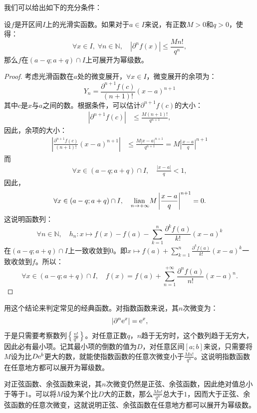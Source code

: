 \documentclass[12pt,UTF8,fontset=none]{ctexbook}
\begin{document}
\begin{appendix}
我们可以给出如下的充分条件：
\begin{tm}\label{tm:c-5-10}
    设$f$是开区间$I$上的光滑实函数。如果对于$a\in I$来说，有正数$M>0$和$q>0$，使得：
    $$ \forall x \in I, \; \forall n \in \mathbb{N},\quad |\partial^n f (x)| \leqslant \frac{M n!}{q^n}, $$
    那么$f$在$(a-q;a+q)\cap I$上可展开为幂级数。
\end{tm}

\begin{proof}
    考虑光滑函数在$a$处的微变展开，$\forall x \in I$，微变展开的余项为：
    $$ Y_n = \frac{\partial^{n+1} f (c)}{(n+1)!}(x - a)^{n+1} $$
    其中$c$是$x$与$a$之间的数。根据条件，可以估计$\partial^{n+1} f (c)$的大小：
    \begin{align*}
        |\partial^{n+1} f (c)| &\leqslant \frac{M (n+1)!}{q^{n+1}},
    \end{align*}
    因此，余项的大小：
    \begin{align*}
        \left|\frac{\partial^{n+1} f (c)}{(n+1)!}(x - a)^{n+1}\right| &\leqslant \frac{M |x - a|^{n+1}}{q^{n+1}} = M\left|\frac{x - a}{q}\right|^{n+1}
    \end{align*}
    而
    \begin{align*}
        \forall x\in(a-q;a+q)\cap I, \quad \frac{|x - a|}{q} < 1,
    \end{align*}
    因此，
    $$ \forall x\in(a-q;a+q)\cap I, \quad  \underset{n\to +\infty}{\operatorname{lian}\,}M\left|\frac{x - a}{q}\right|^{n+1} = 0. $$
    这说明函数列：
    $$ \forall n\in\mathbb{N}, \quad h_n: x\mapsto f(x) - f(a) - \sum_{k=1}^n \frac{\partial^k f (a)}{k!}(x - a)^k $$
    在$(a-q;a+q)\cap I$上一致收敛到$0$。即$\displaystyle x\mapsto f(a) + \sum_{k=1}^n \frac{\partial^k f (a)}{k!}(x - a)^k$一致收敛到$f$。所以：
    $$ \forall x\in (a-q;a+q)\cap I,\quad f(x) = f(a) + \sum_{n=1}^{+\infty} \frac{\partial^n f (a)}{n!}(x - a)^n. $$
\end{proof}

用这个结论来判定常见的经典函数。对指数函数来说，其$n$次微变为：
$$ |\partial^n \mathrm{e}^x| = \mathrm{e}^x, $$
于是只需要考察数列$\left\{\frac{n!}{q^n}\right\}$。对任意正数$q$，$n$趋于无穷时，这个数列趋于无穷大，因此必有最小项。记其最小项的倒数的值为$D$，对任意区间$[a;b]$来说，只需要将$M$设为比$D\mathrm{e}^b$更大的数，就能使指数函数的任意次微变小于$\frac{M n!}{q^n}$。这说明指数函数在任意地方都可以展开为幂级数。

对正弦函数、余弦函数来说，其$n$次微变仍然是正弦、余弦函数，因此绝对值总小于等于$1$。可以将$M$设为某个比$D$大的正数，那么$\frac{M n!}{q^n}$总大于$1$，因而大于正弦、余弦函数的任意次微变，这就说明正弦、余弦函数在任意地方都可以展开为幂级数。


\end{appendix}
\end{document}
